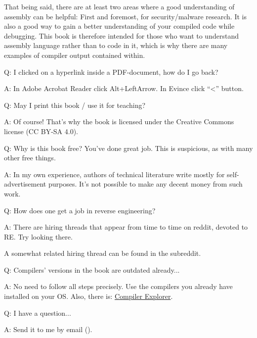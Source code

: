 That being said, there are at least two areas where a good understanding of assembly can be helpful:
First and foremost, for security/malware research. It is also a good way to gain a better understanding of your compiled code while debugging.
This book is therefore intended for those who want to understand assembly language rather
than to code in it, which is why there are many examples of compiler output contained within.

\par Q: I clicked on a hyperlink inside a PDF-document, how do I go back?
\par A: In Adobe Acrobat Reader click Alt+LeftArrow. In Evince click ``<'' button.

\par Q: May I print this book / use it for teaching?
\par A: Of course! That's why the book is licensed under the Creative Commons license (CC BY-SA 4.0).

\par Q: Why is this book free? You've done great job. This is suspicious, as with many other free things.
\par A: In my own experience, authors of technical literature write mostly for self-advertisement purposes.
It's not possible to make any decent money from such work.

\par Q: How does one get a job in reverse engineering?
\par A: There are hiring threads that appear from time to time on reddit, devoted to RE\FNURLREDDIT{}.
Try looking there.

A somewhat related hiring thread can be found in the  subreddit.

\par Q: Compilers' versions in the book are outdated already...
\par A: No need to follow all steps precisely.
Use the compilers you already have installed on your \ac{OS}.
Also, there is: \href{https://godbolt.org/}{Compiler Explorer}.

\par Q: I have a question...
\par A: Send it to me by email (\EMAILS).
